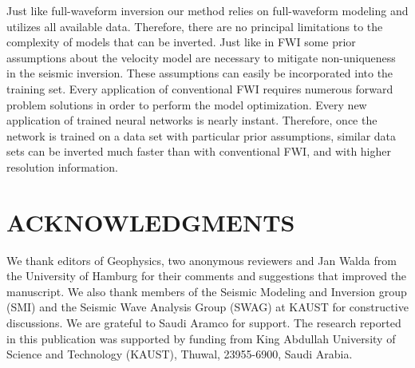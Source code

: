 \documentclass[paper,twocolomn]{geophysics}
\begin{document}
Just like full-waveform inversion our method relies on full-waveform modeling and utilizes all available data. Therefore, there are no principal limitations to the complexity of models that can be inverted. Just like in FWI some prior assumptions about the velocity model are necessary to mitigate non-uniqueness in the seismic inversion. These assumptions can easily be incorporated into the training set. Every application of conventional FWI requires numerous forward problem solutions in order to perform the model optimization. Every new application of trained neural networks is nearly instant. Therefore, once the network is trained on a data set with particular prior assumptions, similar data sets can be inverted much faster than with conventional FWI, and with higher resolution information.









 




%


\section{ACKNOWLEDGMENTS}

We thank editors of Geophysics, two anonymous reviewers and Jan Walda from the University of Hamburg for their comments and suggestions that improved the manuscript. We also thank members of the Seismic Modeling and Inversion group (SMI) and the Seismic Wave Analysis Group (SWAG) at KAUST for constructive discussions. We are grateful to Saudi Aramco for support.
The research reported in this publication was supported by funding from King Abdullah University of Science and Technology (KAUST), Thuwal, 23955-6900, Saudi Arabia.
%
%





\newpage


\end{document}
